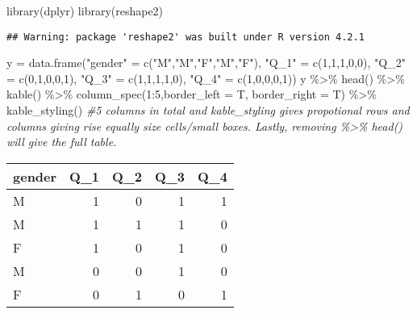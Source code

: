\documentclass[
]{article}
\newenvironment{Shaded}{\begin{snugshade}}{\end{snugshade}}
\newcommand{\AttributeTok}[1]{\textcolor[rgb]{0.77,0.63,0.00}{#1}}
\newcommand{\CommentTok}[1]{\textcolor[rgb]{0.56,0.35,0.01}{\textit{#1}}}
\newcommand{\DecValTok}[1]{\textcolor[rgb]{0.00,0.00,0.81}{#1}}
\newcommand{\FunctionTok}[1]{\textcolor[rgb]{0.00,0.00,0.00}{#1}}
\newcommand{\NormalTok}[1]{#1}
\newcommand{\OtherTok}[1]{\textcolor[rgb]{0.56,0.35,0.01}{#1}}
\newcommand{\SpecialCharTok}[1]{\textcolor[rgb]{0.00,0.00,0.00}{#1}}
\newcommand{\StringTok}[1]{\textcolor[rgb]{0.31,0.60,0.02}{#1}}
\begin{document}
\begin{Shaded}
\begin{Highlighting}[]
\FunctionTok{library}\NormalTok{(dplyr)}
\FunctionTok{library}\NormalTok{(reshape2)}
\end{Highlighting}
\end{Shaded}

\begin{verbatim}
## Warning: package 'reshape2' was built under R version 4.2.1
\end{verbatim}

\begin{Shaded}
\begin{Highlighting}[]
\NormalTok{y }\OtherTok{=} \FunctionTok{data.frame}\NormalTok{(}\StringTok{"gender"} \OtherTok{=} \FunctionTok{c}\NormalTok{(}\StringTok{"M"}\NormalTok{,}\StringTok{"M"}\NormalTok{,}\StringTok{"F"}\NormalTok{,}\StringTok{"M"}\NormalTok{,}\StringTok{"F"}\NormalTok{),}
                \StringTok{"Q\_1"} \OtherTok{=} \FunctionTok{c}\NormalTok{(}\DecValTok{1}\NormalTok{,}\DecValTok{1}\NormalTok{,}\DecValTok{1}\NormalTok{,}\DecValTok{0}\NormalTok{,}\DecValTok{0}\NormalTok{),}
                \StringTok{"Q\_2"} \OtherTok{=} \FunctionTok{c}\NormalTok{(}\DecValTok{0}\NormalTok{,}\DecValTok{1}\NormalTok{,}\DecValTok{0}\NormalTok{,}\DecValTok{0}\NormalTok{,}\DecValTok{1}\NormalTok{),}
                \StringTok{"Q\_3"} \OtherTok{=} \FunctionTok{c}\NormalTok{(}\DecValTok{1}\NormalTok{,}\DecValTok{1}\NormalTok{,}\DecValTok{1}\NormalTok{,}\DecValTok{1}\NormalTok{,}\DecValTok{0}\NormalTok{),}
                \StringTok{"Q\_4"} \OtherTok{=} \FunctionTok{c}\NormalTok{(}\DecValTok{1}\NormalTok{,}\DecValTok{0}\NormalTok{,}\DecValTok{0}\NormalTok{,}\DecValTok{0}\NormalTok{,}\DecValTok{1}\NormalTok{))}
\NormalTok{y }\SpecialCharTok{\%\textgreater{}\%} \FunctionTok{head}\NormalTok{() }\SpecialCharTok{\%\textgreater{}\%} \FunctionTok{kable}\NormalTok{() }\SpecialCharTok{\%\textgreater{}\%} \FunctionTok{column\_spec}\NormalTok{(}\DecValTok{1}\SpecialCharTok{:}\DecValTok{5}\NormalTok{,}\AttributeTok{border\_left =}\NormalTok{ T, }\AttributeTok{border\_right =}\NormalTok{ T)  }\SpecialCharTok{\%\textgreater{}\%}
\FunctionTok{kable\_styling}\NormalTok{() }\CommentTok{\#5 columns in total and kable\_styling gives propotional rows and columns giving rise equally size cells/small boxes. Lastly, removing  \%\textgreater{}\% head() will give the full table.}
\end{Highlighting}
\end{Shaded}

\begin{table}
\centering
\begin{tabular}{|>{}l|||>{}r|||>{}r|||>{}r|||>{}r|}
\hline
gender & Q\_1 & Q\_2 & Q\_3 & Q\_4\\
\hline
M & 1 & 0 & 1 & 1\\
\hline
M & 1 & 1 & 1 & 0\\
\hline
F & 1 & 0 & 1 & 0\\
\hline
M & 0 & 0 & 1 & 0\\
\hline
F & 0 & 1 & 0 & 1\\
\hline
\end{tabular}
\end{table}
\end{document}

